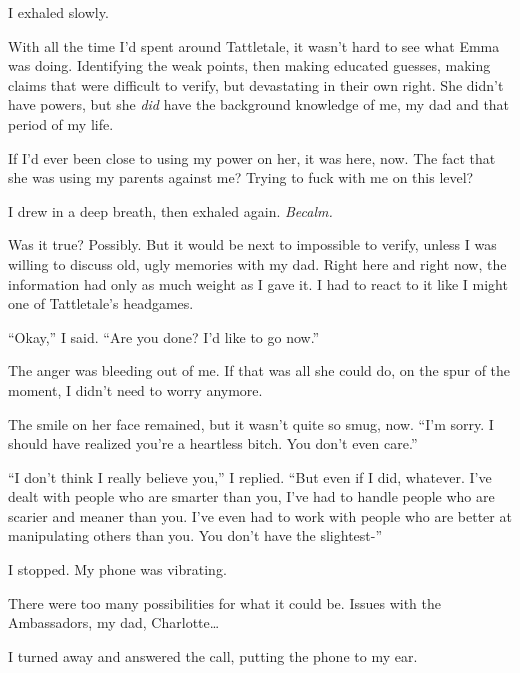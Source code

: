 I exhaled slowly.



With all the time I'd spent around Tattletale, it wasn't hard to see what Emma was doing.  Identifying the weak points, then making educated guesses, making claims that were difficult to verify, but devastating in their own right.  She didn't have powers, but she \emph{did} have the background knowledge of me, my dad and that period of my life.



If I'd ever been close to using my power on her, it was here, now.  The fact that she was using my parents against me?  Trying to fuck with me on this level?



I drew in a deep breath, then exhaled again.  \emph{Be}\emph{calm.}



Was it true?  Possibly.  But it would be next to impossible to verify, unless I was willing to discuss old, ugly memories with my dad.  Right here and right now, the information had only as much weight as I gave it.  I had to react to it like I might one of Tattletale's headgames.



``Okay,'' I said.  ``Are you done?  I'd like to go now.''



The anger was bleeding out of me.  If that was all she could do, on the spur of the moment, I didn't need to worry anymore.



The smile on her face remained, but it wasn't quite so smug, now.  ``I'm sorry.  I should have realized you're a heartless bitch.  You don't even care.''



``I don't think I really believe you,'' I replied.  ``But even if I did, whatever.  I've dealt with people who are smarter than you, I've had to handle people who are scarier and meaner than you.  I've even had to work with people who are better at manipulating others than you.  You don't have the slightest-''



I stopped.  My phone was vibrating.



There were too many possibilities for what it could be.  Issues with the Ambassadors, my dad, Charlotte\ldots



I turned away and answered the call, putting the phone to my ear.



